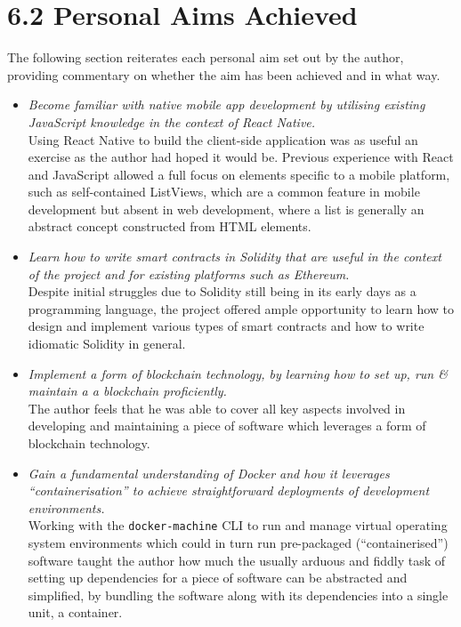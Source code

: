 \section{6.2 Personal Aims Achieved}\label{personal-aims-achieved}

The following section reiterates each personal aim set out by the
author, providing commentary on whether the aim has been achieved and in
what way.

\begin{itemize}
\item
  \emph{Become familiar with native mobile app development by utilising
  existing JavaScript knowledge in the context of React Native.}\\
  Using React Native to build the client-side application was as useful
  an exercise as the author had hoped it would be. Previous experience
  with React and JavaScript allowed a full focus on elements specific to
  a mobile platform, such as self-contained ListViews, which are a
  common feature in mobile development but absent in web development,
  where a list is generally an abstract concept constructed from HTML
  elements.
\item
  \emph{Learn how to write smart contracts in Solidity that are useful
  in the context of the project and for existing platforms such as
  Ethereum.}\\
  Despite initial struggles due to Solidity still being in its early
  days as a programming language, the project offered ample opportunity
  to learn how to design and implement various types of smart contracts
  and how to write idiomatic Solidity in general.
\item
  \emph{Implement a form of blockchain technology, by learning how to
  set up, run \& maintain a a blockchain proficiently.}\\
  The author feels that he was able to cover all key aspects involved in
  developing and maintaining a piece of software which leverages a form
  of blockchain technology.
\item
  \emph{Gain a fundamental understanding of Docker and how it leverages
  ``containerisation'' to achieve straightforward deployments of
  development environments.}\\
  Working with the \texttt{docker-machine} CLI to run and manage virtual
  operating system environments which could in turn run pre-packaged
  (``containerised'') software taught the author how much the usually
  arduous and fiddly task of setting up dependencies for a piece of
  software can be abstracted and simplified, by bundling the software
  along with its dependencies into a single unit, a container.
\end{itemize}

